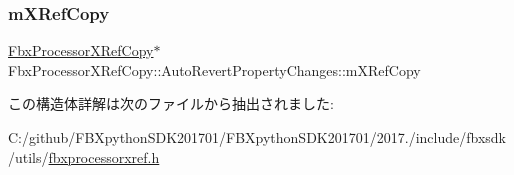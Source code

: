 \subsubsection{\texorpdfstring{m\+X\+Ref\+Copy}{mXRefCopy}}
{\footnotesize\ttfamily \hyperlink{class_fbx_processor_x_ref_copy}{Fbx\+Processor\+X\+Ref\+Copy}$\ast$ Fbx\+Processor\+X\+Ref\+Copy\+::\+Auto\+Revert\+Property\+Changes\+::m\+X\+Ref\+Copy}



この構造体詳解は次のファイルから抽出されました\+:\begin{DoxyCompactItemize}
\item 
C\+:/github/\+F\+B\+Xpython\+S\+D\+K201701/\+F\+B\+Xpython\+S\+D\+K201701/2017./include/fbxsdk/utils/\hyperlink{fbxprocessorxref_8h}{fbxprocessorxref.\+h}\end{DoxyCompactItemize}
